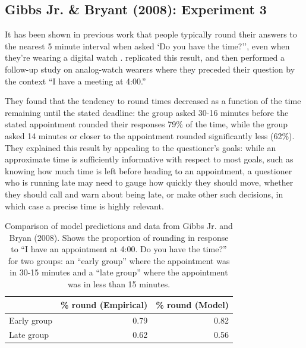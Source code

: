 \documentclass[12pt, floatsintext, jou]{apa6}
\begin{document}
\subsection{Gibbs Jr. \& Bryant (2008): Experiment 3}

It has been shown in previous work that people typically round their answers to the nearest 5 minute interval when asked `Do you have the time?'', even when they're wearing a digital watch \cite{DerHenstCarlesSperber02_RelevanceTellingTime}.   replicated this result, and then performed a follow-up study on analog-watch wearers where they preceded their question by the context ``I have a meeting at 4:00.'' 

They found that the tendency to round times decreased as a function of the time remaining until the stated deadline: the group asked 30-16 minutes before the stated appointment rounded their responses 79\% of the time, while the group asked 14 minutes or closer to the appointment rounded significantly less (62\%). They explained this result by appealing to the questioner's goals: while an approximate time is sufficiently informative with respect to most goals, such as knowing how much time is left before heading to an appointment, a questioner who is running late may need to gauge how quickly they should move, whether they should call and warn about being late, or make other such decisions, in which case a precise time is highly relevant. 
\begin{table}[t]
\centering
\begin{tabular}{ p{2cm} | r |||||| r }
&  \% round (Empirical) &  \% round (Model) \\
\hline
Early group &  0.79 & 0.82 \\
\hline
Late group     &0.62  & 0.56 \\
\end{tabular}
\\[1.5pt]
\caption{Comparison of model predictions and data from Gibbs Jr. and Bryan (2008). Shows the proportion of rounding in response to ``I have an appointment at 4:00. Do you have the time?'' for two groups: an ``early group'' where the appointment was in 30-15 minutes and a ``late group'' where the appointment was in less than 15 minutes.} 
\label{table:gibbsJrExp3}
\end{table}
\end{document}
